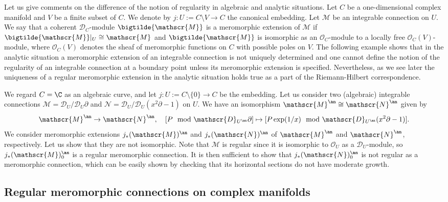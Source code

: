 Let us give comments on the difference of the notion of regularity in algebraic and analytic situations. Let $C$ be a one-dimensional complex manifold and $V$ be a finite subset of $C$. We denote by $j:U:=C\setminus V\to C$ the canonical embedding. Let $\mathscr{M}$ be an integrable connection on $U$. We say that a coherent $\mathscr{D}_C$-module $\bigtilde{\mathscr{M}}$ is a meromorphic extension of $\mathscr{M}$ if $\bigtilde{\mathscr{M}}|_U\cong\mathscr{M}$ and $\bigtilde{\mathscr{M}}$ is isomorphic as an $\mathscr{O}_C$-module to a locally free $\mathscr{O}_C(V)$-module, where $\mathscr{O}_C(V)$ denotes the sheaf of meromorphic functions on $C$ with possible poles on $V$. The following example shows that in the analytic situation a meromorphic extension of an integrable connection is not uniquely determined and one cannot define the notion of the regularity of an integrable connection at a boundary point unless its meromorphic extension is specified. Nevertheless, as we see later the uniqueness of a regular meromorphic extension in the analytic situation holds true as a part of the Riemann-Hilbert correspondence.

\begin{example}
We regard $C=\C$ as an algebraic curve, and let $j:U:=C\setminus\{0\}\to C$ be the embedding. Let us consider two (algebraic) integrable connections $\mathscr{M}=\mathscr{D}_U/\mathscr{D}_U\partial$ and $\mathscr{N}=\mathscr{D}_U/\mathscr{D}_U(x^2\partial-1)$ on $U$. We have an isomorphism $\mathscr{M}^{\an}\cong\mathscr{N}^{\an}$ given by
\[\mathscr{M}^{\an}\to\mathscr{N}^{\an},\quad [P\mod\mathscr{D}_{U^{\an}}\partial]\mapsto [P\exp(1/x)\mod\mathscr{D}_{U^{\an}}(x^2\partial-1)].\]
We consider meromorphic extensions $j_*(\mathscr{M})^{\an}$ and $j_*(\mathscr{N})^{\an}$ of $\mathscr{M}^{\an}$ and $\mathscr{N}^{\an}$, respectively. Let us show that they are not isomorphic. Note that $\mathscr{M}$ is regular since it is isomorphic to $\mathscr{O}_U$ as a $\mathscr{D}_U$-module, so $j_*(\mathscr{M})^{\an}_0$ is a regular meromorphic connection. It is then sufficient to show that $j_*(\mathscr{N})^{\an}_0$ is not regular as a meromorphic connection, which can be easily shown by checking that its horizontal sections do not have moderate growth.
\end{example}

\subsection{Regular meromorphic connections on complex manifolds}
